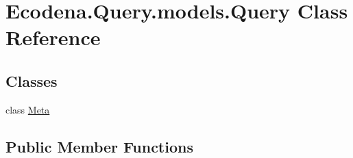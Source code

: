 \hypertarget{class_ecodena_1_1_query_1_1models_1_1_query}{
\section{Ecodena.Query.models.Query Class Reference}
\label{de/d81/class_ecodena_1_1_query_1_1models_1_1_query}
}
\subsection*{Classes}
\begin{DoxyCompactItemize}
\item 
class \hyperlink{class_ecodena_1_1_query_1_1models_1_1_query_1_1_meta}{Meta}
\end{DoxyCompactItemize}
\subsection*{Public Member Functions}
